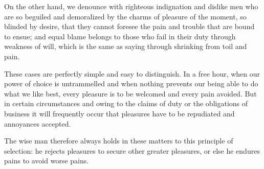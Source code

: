 On the other hand, we denounce with righteous indignation and dislike men who are so beguiled and demoralized by the charms of pleasure of the moment, so blinded by desire, that they cannot foresee the pain and trouble that are bound to ensue; and equal blame belongs to those who fail in their duty through weakness of will, which is the same as saying through shrinking from toil and pain.

These cases are perfectly simple and easy to distinguish. In a free hour, when our power of choice is untrammelled and when nothing prevents our being able to do what we like best, every pleasure is to be welcomed and every pain avoided. But in certain circumstances and owing to the claims of duty or the obligations of business it will frequently occur that pleasures have to be repudiated and annoyances accepted. 

The wise man therefore always holds in these matters to this principle of selection: he rejects pleasures to secure other greater pleasures, or else he endures pains to avoid worse pains.

\vfil\eject
